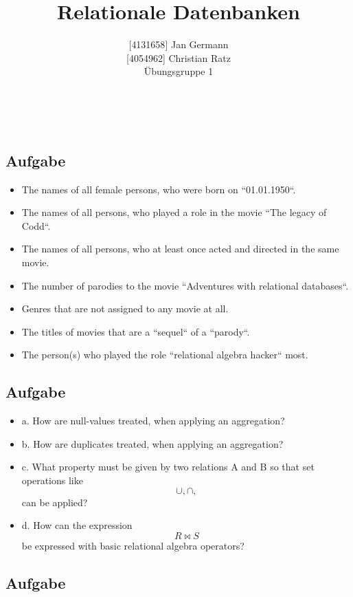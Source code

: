 \documentclass[11pt,a4paper,DIV=9]{scrartcl}
\author{{[}4131658{]} Jan Germann \\{[}4054962{]} Christian Ratz\\Übungsgruppe 1}
\title{Relationale Datenbanken}
\newcounter{temp}
\newcommand{\aufgabe}[1]{
  \setcounter{temp}{\value{subsection}}
  \setcounter{subsection}{#1}
  \addtocounter{subsection}{-1}
  \subsection{Aufgabe}
  \setcounter{subsection}{\value{temp}}
}
\renewcommand{\author}[1]{\renewcommand{\author}{#1}}
\renewcommand{\title}[1]{\renewcommand{\title}{#1}}
\newcommand{\makehomeworktitle}{
  \begin{minipage}[t]{6.5cm}
    \sf{\author}
  \end{minipage}
  \begin{minipage}[t]{6.5cm}
    \begin{flushright}
      \sf{\title\\\today}
    \end{flushright}
  \end{minipage}
  \\[0.2cm]
  \begin{center}
    \sf{
      \color{blue}{
        \LARGE{Aufgabenblatt \blattnr}
      }
    }
  \end{center}
  \vspace{0.1cm}
}
\begin{document}
\makehomeworktitle
\aufgabe{1}
\begin{itemize}
 \item The names of all female persons, who were born on ``01.01.1950``.
 \item The names of all persons, who played a role in the movie ``The legacy of Codd``.
 \item The names of all persons, who at least once acted and directed in the same movie.
 \item The number of parodies to the movie ``Adventures with relational databases``.
 \item Genres that are not assigned to any movie at all.
 \item The titles of movies that are a ``sequel`` of a ``parody``.
 \item The person(s) who played the role ``relational algebra hacker`` most.
\end{itemize}  
\aufgabe{2}
\begin{itemize}
 \item a. How are null-values treated, when applying an aggregation?
 \item b. How are duplicates treated, when applying an aggregation?
 \item c. What property must be given by two relations A and B so that set operations like \begin{displaymath}
\cup, \cap,    \end{displaymath} can be applied?
\item d. How can the expression \begin{displaymath}R \Join S\end{displaymath} be expressed with basic relational algebra operators?
\end{itemize}
\aufgabe{3}
\end{document}
